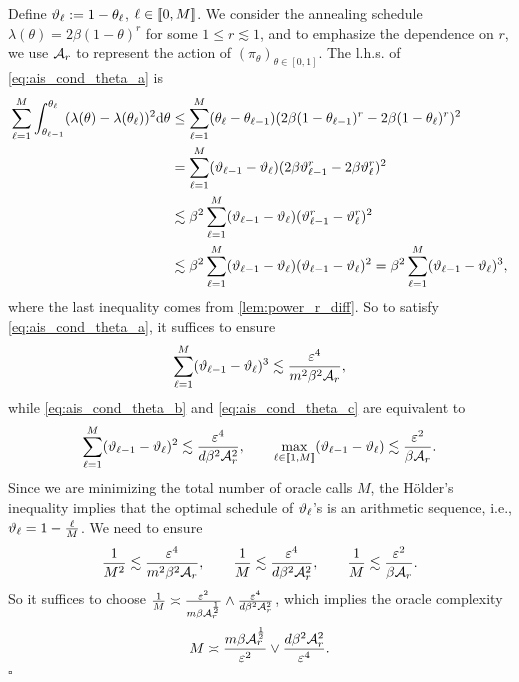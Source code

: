 Define $\vartheta_\ell:=1-\theta_\ell$, $\ell\in\left[\!\left[0,M\right]\!\right]$. We consider the annealing schedule $\lambda(\theta)=2\beta(1-\theta)^r$ for some $1\le r\lesssim1$, and to emphasize the dependence on $r$, we use $\mathcal{A}_r$ to represent the action of $(\pi_\theta)_{\theta\in[0,1]}$. The l.h.s. of \cref{eq:ais_cond_theta_a} is
\begin{align*}
    \sum_{\ell=1}^M\int_{\theta_{\ell-1}}^{\theta_\ell}(\lambda(\theta)-\lambda(\theta_\ell))^2\mathrm{d}\theta & \le\sum_{\ell=1}^M(\theta_\ell-\theta_{\ell-1})(2\beta(1-\theta_{\ell-1})^r-2\beta(1-\theta_\ell)^r)^2                                                        \\
                                                                                                 & =\sum_{\ell=1}^M(\vartheta_{\ell-1}-\vartheta_\ell)(2\beta\vartheta_{\ell-1}^r-2\beta\vartheta_\ell^r)^2                                                      \\
                                                                                                 & \lesssim\beta^2\sum_{\ell=1}^M(\vartheta_{\ell-1}-\vartheta_\ell)(\vartheta_{\ell-1}^r-\vartheta_\ell^r)^2                                                    \\
                                                                                                 & \lesssim\beta^2\sum_{\ell=1}^M(\vartheta_{\ell-1}-\vartheta_\ell)(\vartheta_{\ell-1}-\vartheta_\ell)^2=\beta^2\sum_{\ell=1}^M(\vartheta_{\ell-1}-\vartheta_\ell)^3,
\end{align*}
where the last inequality comes from \cref{lem:power_r_diff}. So to satisfy \cref{eq:ais_cond_theta_a}, it suffices to ensure
$$\sum_{\ell=1}^M(\vartheta_{\ell-1}-\vartheta_\ell)^3\lesssim\frac{\varepsilon^4}{m^2\beta^2\mathcal{A}_r},$$
while \cref{eq:ais_cond_theta_b} and \cref{eq:ais_cond_theta_c} are equivalent to
$$\sum_{\ell=1}^M(\vartheta_{\ell-1}-\vartheta_\ell)^2\lesssim\frac{\varepsilon^4}{d\beta^2\mathcal{A}_r^2},\qquad\max_{\ell\in\left[\!\left[1,M\right]\!\right]}(\vartheta_{\ell-1}-\vartheta_\ell)\lesssim\frac{\varepsilon^2}{\beta\mathcal{A}_r}.$$
Since we are minimizing the total number of oracle calls $M$, the H\"older's inequality implies that the optimal schedule of $\vartheta_\ell$'s is an arithmetic sequence, i.e., $\vartheta_\ell=1-\frac{\ell}{M}$. We need to ensure
$$\frac{1}{M^2}\lesssim\frac{\varepsilon^4}{m^2\beta^2\mathcal{A}_r},\qquad\frac{1}{M}\lesssim\frac{\varepsilon^4}{d\beta^2\mathcal{A}_r^2},\qquad\frac{1}{M}\lesssim\frac{\varepsilon^2}{\beta\mathcal{A}_r}.$$
So it suffices to choose $\frac{1}{M}\asymp\frac{\varepsilon^2}{m\beta\mathcal{A}_r^\frac{1}{2}}\wedge\frac{\varepsilon^4}{d\beta^2\mathcal{A}_r^2}$, which implies the oracle complexity
$$M\asymp\frac{m\beta\mathcal{A}_r^\frac{1}{2}}{\varepsilon^2}\vee\frac{d\beta^2\mathcal{A}_r^2}{\varepsilon^4}.$$
\hfill$\square$